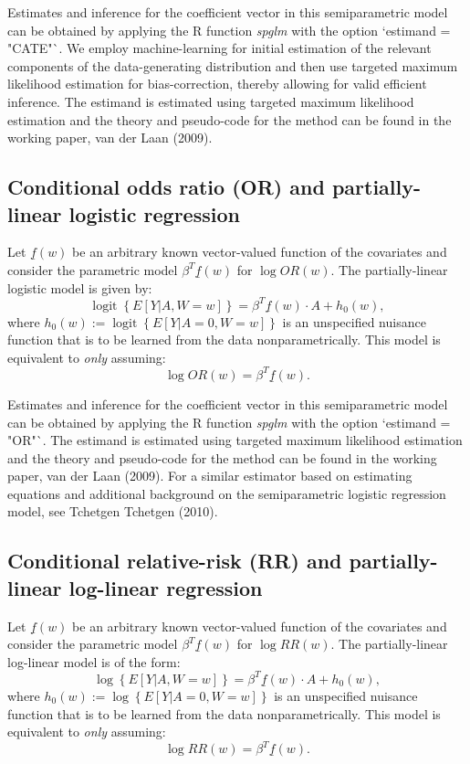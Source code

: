 \documentclass[article]{jss}
\DeclareMathOperator{\logit}{logit}
\begin{document}
Estimates and inference for the coefficient vector in this semiparametric model can be obtained by applying the R function \textit{spglm} with the option `estimand = "CATE"`. We employ machine-learning for initial estimation of the relevant components of the data-generating distribution and then use targeted maximum likelihood estimation for bias-correction, thereby allowing for valid efficient inference. The estimand is estimated using targeted maximum likelihood estimation and the theory and pseudo-code for the method can be found in the working paper, van der Laan (2009). \nocite{OddsRatioreadingsTMLE}

\subsection{Conditional odds ratio (OR) and partially-linear logistic regression}
Let $\underline{f}(w)$ be an arbitrary known vector-valued function of the covariates and consider the parametric model $\beta^T \underline{f}(w)$ for $\log OR(w)$. The partially-linear logistic model is given by:
$$\logit\left\{E[Y|A,W=w]\right\} = \beta^T \underline{f}(w) \cdot A + h_0(w),$$
where $ h_0(w) := \logit\left\{E[Y|A=0,W=w]\right\}$ is an unspecified nuisance function that is to be learned from the data nonparametrically. This model is equivalent to \textit{only} assuming:
$$\log OR(w) = \beta^T \underline{f}(w).$$

Estimates and inference for the coefficient vector in this semiparametric model can be obtained by applying the R function \textit{spglm} with the option `estimand = "OR"`. The estimand is estimated using targeted maximum likelihood estimation and the theory and pseudo-code for the method can be found in the working paper, van der Laan (2009). \nocite{OddsRatioreadingsTMLE}
For a similar estimator based on estimating equations and additional background on the semiparametric logistic regression model, see Tchetgen Tchetgen (2010). \nocite{TchetgenOddsRatio}



\subsection{Conditional relative-risk (RR) and partially-linear log-linear regression}
Let $\underline{f}(w)$ be an arbitrary known vector-valued function of the covariates and consider the parametric model $\beta^T \underline{f}(w)$ for $\log RR(w)$. The partially-linear log-linear model is of the form:
$$\log\left\{E[Y|A,W=w]\right\} = \beta^T \underline{f}(w) \cdot A + h_0(w),$$
where $ h_0(w) := \log\left\{E[Y|A=0,W=w]\right\}$ is an unspecified nuisance function that is to be learned from the data nonparametrically. This model is equivalent to \textit{only} assuming:
$$\log RR(w) =\beta^T \underline{f}(w).$$
\end{document}
